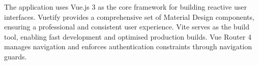 The application uses Vue.js 3 as the core framework for building reactive user interfaces. Vuetify provides a comprehensive set of Material Design components, ensuring a professional and consistent user experience. Vite serves as the build tool, enabling fast development and optimised production builds. Vue Router 4 manages navigation and enforces authentication constraints through navigation guards.
